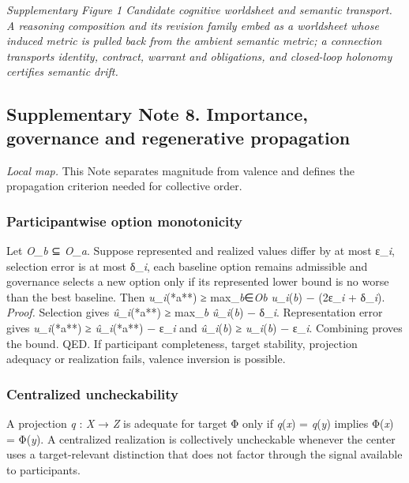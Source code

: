 \emph{Supplementary Figure 1 \textbar{} Candidate cognitive worldsheet
and semantic transport. A reasoning composition and its revision family
embed as a worldsheet whose induced metric is pulled back from the
ambient semantic metric; a connection transports identity, contract,
warrant and obligations, and closed-loop holonomy certifies semantic
drift.}

\hypertarget{supplementary-note-8.-importance-governance-and-regenerative-propagation}{%
\subsection{Supplementary Note 8. Importance, governance and
regenerative
propagation}\label{supplementary-note-8.-importance-governance-and-regenerative-propagation}}

\emph{Local map.} This Note separates magnitude from valence and defines
the propagation criterion needed for collective order.

\hypertarget{participantwise-option-monotonicity}{%
\subsubsection{Participantwise option
monotonicity}\label{participantwise-option-monotonicity}}

Let \emph{O\_b} ⊆ \emph{O\_a}. Suppose represented and realized values
differ by at most ε\_\emph{i}, selection error is at most δ\_\emph{i},
each baseline option remains admissible and governance selects a new
option only if its represented lower bound is no worse than the best
baseline. Then \emph{u\_i}(*a**) ≥ max\_\emph{b}∈\emph{Ob}
\emph{u\_i}(\emph{b}) − (2ε\_\emph{i} + δ\_\emph{i}). \emph{Proof.}
Selection gives \emph{û\_i}(*a**) ≥ max\_\emph{b} \emph{û\_i}(\emph{b})
− δ\_\emph{i}. Representation error gives \emph{u\_i}(*a**) ≥
\emph{û\_i}(*a**) − ε\_\emph{i} and \emph{û\_i}(\emph{b}) ≥
\emph{u\_i}(\emph{b}) − ε\_\emph{i}. Combining proves the bound. QED. If
participant completeness, target stability, projection adequacy or
realization fails, valence inversion is possible.

\hypertarget{centralized-uncheckability}{%
\subsubsection{Centralized
uncheckability}\label{centralized-uncheckability}}

A projection \emph{q} : \emph{X} → \emph{Z} is adequate for target Φ
only if \emph{q}(\emph{x}) = \emph{q}(\emph{y}) implies Φ(\emph{x}) =
Φ(\emph{y}). A centralized realization is collectively uncheckable
whenever the center uses a target-relevant distinction that does not
factor through the signal available to participants.

